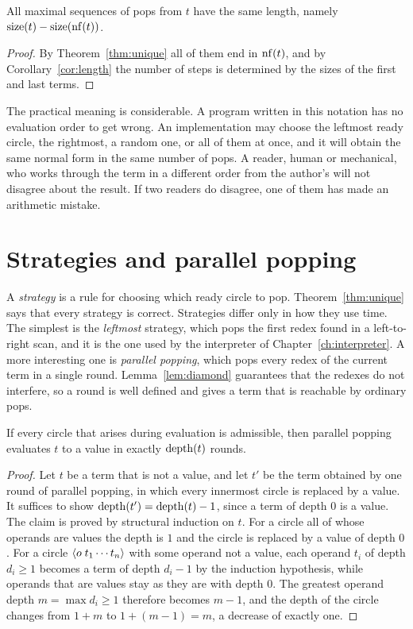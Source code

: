 \begin{corollary}\label{cor:order}
All maximal sequences of pops from $t$ have the same length, namely $\operatorname{size}(t)-\operatorname{size}(\operatorname{nf}(t))$.
\end{corollary}
\begin{proof}
By Theorem~\ref{thm:unique} all of them end in $\operatorname{nf}(t)$, and by Corollary~\ref{cor:length} the number of steps is determined by the sizes of the first and last terms.
\end{proof}

The practical meaning is considerable. A program written in this notation has no evaluation order to get wrong. An implementation may choose the leftmost ready circle, the rightmost, a random one, or all of them at once, and it will obtain the same normal form in the same number of pops. A reader, human or mechanical, who works through the term in a different order from the author's will not disagree about the result. If two readers do disagree, one of them has made an arithmetic mistake.

\section{Strategies and parallel popping}

A \emph{strategy} is a rule for choosing which ready circle to pop. Theorem~\ref{thm:unique} says that every strategy is correct. Strategies differ only in how they use time. The simplest is the \emph{leftmost} strategy, which pops the first redex found in a left-to-right scan, and it is the one used by the interpreter of Chapter~\ref{ch:interpreter}. A more interesting one is \emph{parallel popping}, which pops every redex of the current term in a single round. Lemma~\ref{lem:diamond} guarantees that the redexes do not interfere, so a round is well defined and gives a term that is reachable by ordinary pops.

\begin{proposition}\label{prop:parallel}
If every circle that arises during evaluation is admissible, then parallel popping evaluates $t$ to a value in exactly $\operatorname{depth}(t)$ rounds.
\end{proposition}
\begin{proof}
Let $t$ be a term that is not a value, and let $t'$ be the term obtained by one round of parallel popping, in which every innermost circle is replaced by a value. It suffices to show $\operatorname{depth}(t')=\operatorname{depth}(t)-1$, since a term of depth $0$ is a value. The claim is proved by structural induction on $t$. For a circle all of whose operands are values the depth is $1$ and the circle is replaced by a value of depth $0$. For a circle $\langle o\; t_1\cdots t_n\rangle$ with some operand not a value, each operand $t_i$ of depth $d_i\ge1$ becomes a term of depth $d_i-1$ by the induction hypothesis, while operands that are values stay as they are with depth $0$. The greatest operand depth $m=\max d_i\ge1$ therefore becomes $m-1$, and the depth of the circle changes from $1+m$ to $1+(m-1)=m$, a decrease of exactly one.
\end{proof}

